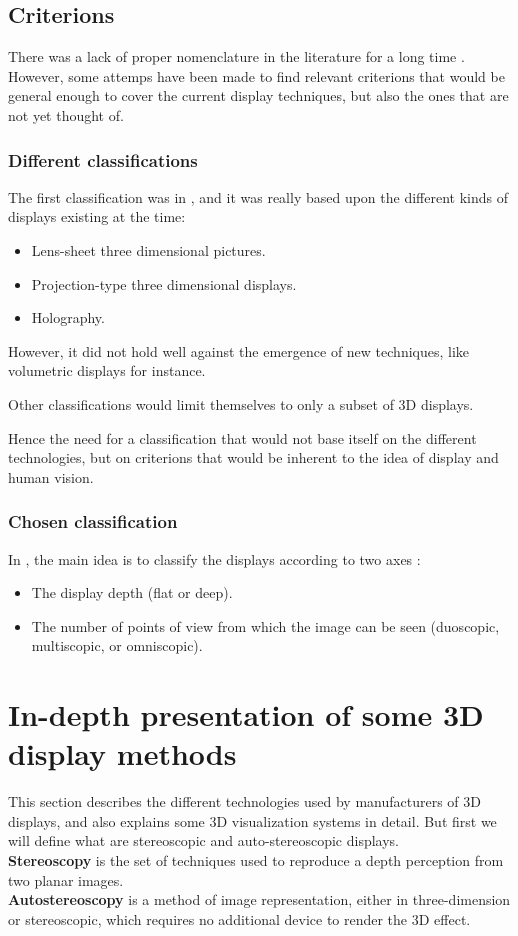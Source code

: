 \subsection{Criterions}
There was a lack of proper nomenclature in the literature for a long time \cite{pimenta2012comprehensive}. However, some attemps have been made to find relevant criterions that would be general enough to cover the current display techniques, but also the ones that are not yet thought of.

\subsubsection{Different classifications}
The first classification was in \cite{okoshi1976three}, and it was really based upon the different kinds of displays existing at the time: 
\begin{itemize}
\item Lens-sheet three dimensional pictures.
\item Projection-type three dimensional displays.
\item Holography.
\end{itemize}

However, it did not hold well against the emergence of new techniques, like volumetric displays for instance.

Other classifications %
would limit themselves to only a subset of 3D displays.

Hence the need for a classification that would not base itself on the different technologies, but on criterions that would be inherent to the idea of display and human vision.

\subsubsection{Chosen classification}
In \cite{pimenta2012comprehensive}, the main idea is to classify the displays according to two axes : 

\begin{itemize}
\item The display depth (flat or deep).
\item The number of points of view from which the image can be seen (duoscopic, multiscopic, or omniscopic).
\end{itemize}

\section{In-depth presentation of some 3D display methods}
This section describes the different technologies used by manufacturers of 3D displays, and also explains some 3D visualization systems in detail. But first we will define what are stereoscopic and auto-stereoscopic displays. \\
\textbf{Stereoscopy} is the set of techniques used to reproduce a depth perception from two planar images.\\
\textbf{Autostereoscopy} is a method of image representation, either in three-dimension or stereoscopic, which requires no additional device to render the 3D effect. 

